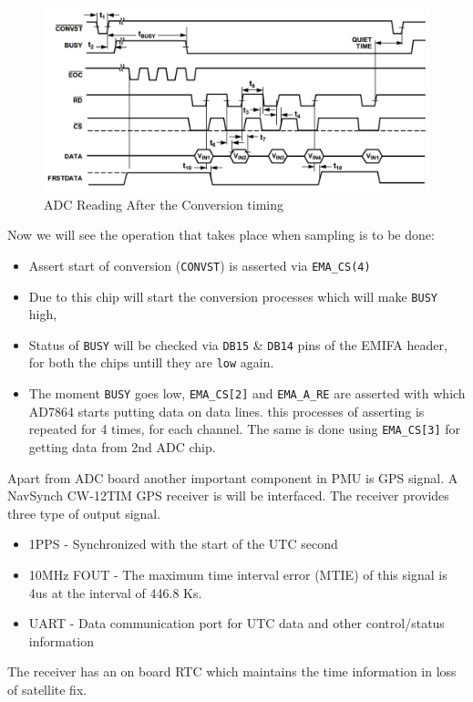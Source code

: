 \begin{appendix}
\begin{figure}[h]
	\includegraphics[width =\columnwidth]{fig/adc_time_diag.png}
	\caption{ADC Reading After the Conversion timing \cite{uguide:adc}}
	\label{fig:adc_timing}
\end{figure}
Now we will see the operation that takes place when sampling  is to be done:
\begin{itemize}
	\item Assert start of conversion (\texttt{CONVST}) is asserted via \texttt{EMA\_CS(4)}
	\item Due to this chip will start the conversion processes which will make \texttt{BUSY} high,
	\item Status of \texttt{BUSY}  will be checked via \texttt{DB15} \& \texttt{DB14} pins of the EMIFA header, for both the chips untill they are \texttt{low} again.
	\item The moment \texttt{BUSY} goes low, \texttt{EMA\_CS[2]} and \texttt{EMA\_A\_RE} are asserted with which AD7864 starts putting data on data lines. this processes of asserting is repeated for 4 times, for each channel. The same is done using \texttt{EMA\_CS[3]} for getting data from 2nd ADC chip.
\end{itemize}
Apart from ADC board another important component in PMU is GPS signal. A NavSynch CW-12TIM GPS receiver is will be interfaced. The receiver provides three type of output signal.
\begin{itemize}
	\item 1PPS - Synchronized with the start of the UTC second
	\item 10MHz FOUT - The maximum time interval error (MTIE) of this signal is 4us at the interval of 446.8 Ks.
	\item UART - Data communication port for UTC data and other control/status information
\end{itemize}
The receiver has an on board RTC which maintains the time information in loss of satellite fix.


\end{appendix}
